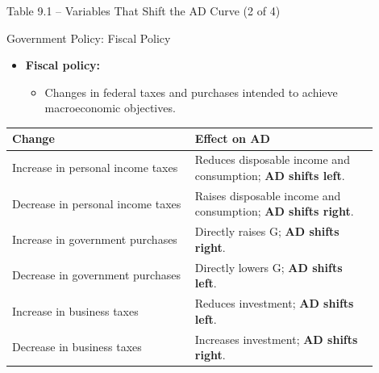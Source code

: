 \documentclass[aspectratio=169]{beamer}
\begin{document}
\begin{frame}{Table 9.1 -- Variables That Shift the AD Curve (2 of 4)}
\transfade
\begin{block}{Government Policy: Fiscal Policy}
\end{block}
\begin{itemize}
  \item \textbf{Fiscal policy:}
  \begin{itemize}
    \item Changes in federal taxes and purchases intended to achieve macroeconomic objectives.
  \end{itemize}
\end{itemize}
\begin{table}[h]
\centering
\begin{tabular}{p{0.45\linewidth} p{0.45\linewidth}}
\toprule
\textbf{Change} & \textbf{Effect on AD} \\
\midrule
Increase in personal income taxes & Reduces disposable income and consumption; \textbf{AD shifts left}. \\
Decrease in personal income taxes & Raises disposable income and consumption; \textbf{AD shifts right}. \\
Increase in government purchases & Directly raises G; \textbf{AD shifts right}. \\
Decrease in government purchases & Directly lowers G; \textbf{AD shifts left}. \\
Increase in business taxes & Reduces investment; \textbf{AD shifts left}. \\
Decrease in business taxes & Increases investment; \textbf{AD shifts right}. \\
\bottomrule
\end{tabular}
\end{table}
\end{frame}
\end{document}
